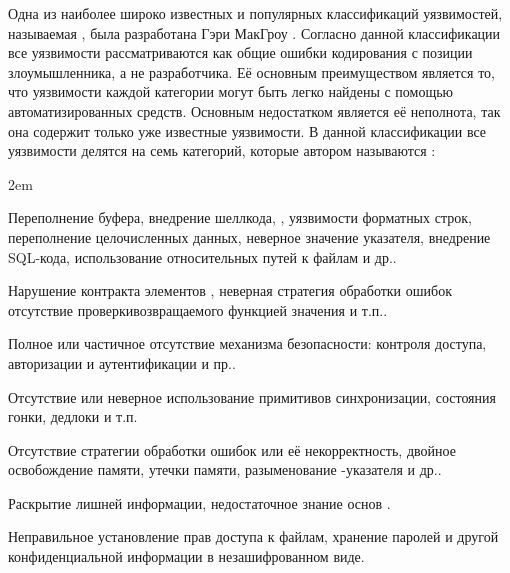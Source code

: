 %
Одна из наиболее широко известных и популярных классификаций уязвимостей, называемая , была разработана Гэри МакГроу   . 
%
Согласно данной классификации все уязвимости рассматриваются как общие ошибки кодирования с позиции злоумышленника, а не разработчика. 
%
Её основным преимуществом является то, что уязвимости каждой категории могут быть легко найдены с помощью автоматизированных средств. 
%
Основным недостатком является её неполнота, так она содержит только уже известные уязвимости. 
%
В данной классификации все уязвимости делятся на семь категорий, которые автором называются 
:  
\begin{description}
	\leftskip2em%
	\setlength{\itemsep}{0pt}%
	\setlength{\parsep}{0pt}%

	\item[Проверка входных данных и их представление.] Переполнение буфера, внедрение шеллкода, , уязвимости форматных строк, переполнение целочисленных данных, неверное значение указателя, внедрение SQL-кода, использование относительных путей к файлам и др..
	\item[Неправильное использование API.] Нарушение контракта элементов , неверная стратегия обработки ошибок отсутствие проверкивозвращаемого функцией значения и т.п..

	\item[Средства безопасности.] Полное или частичное отсутствие механизма безопасности: контроля доступа, авторизации и аутентификации и пр..

	\item[Время и состояние.] Отсутствие или неверное использование примитивов синхронизации, состояния гонки, дедлоки и т.п.
	
	\item[Ошибки.] Отсутствие стратегии обработки ошибок или её некорректность, двойное освобождение памяти, утечки памяти, разыменование -указателя и др..
	
	\item[Инкапсуляция.] Раскрытие лишней информации, недостаточное знание основ .
	
	\item[Программное окружение.] Неправильное установление прав доступа к файлам, хранение паролей и другой конфиденциальной информации в незашифрованном виде.
\end{description}

